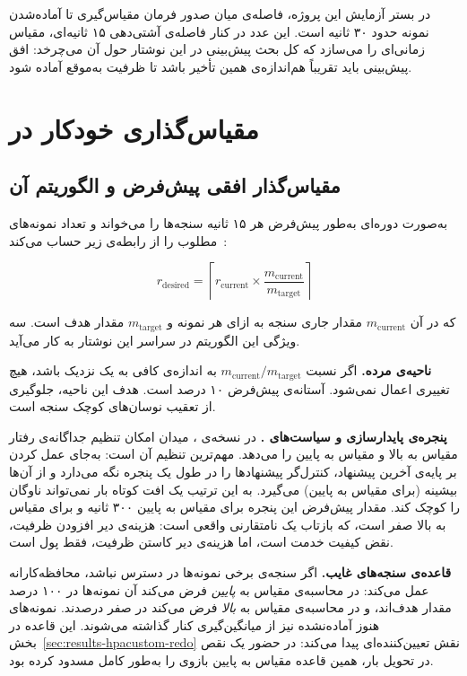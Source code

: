 در بستر آزمایش این پروژه، فاصله‌ی میان صدور فرمان مقیاس‌گیری تا آماده‌شدن نمونه حدود ۳۰ ثانیه
است. این عدد در کنار فاصله‌ی آشتی‌دهی ۱۵ ثانیه‌ای، مقیاس زمانی‌ای را می‌سازد که کل بحث
پیش‌بینی در این نوشتار حول آن می‌چرخد: افق پیش‌بینی باید تقریباً هم‌اندازه‌ی همین تأخیر باشد
تا ظرفیت به‌موقع آماده شود.

\section{مقیاس‌گذاری خودکار در }
\label{sec:bg-autoscaling-k8s}

\subsection{مقیاس‌گذار افقی پیش‌فرض و الگوریتم آن}
\label{sec:bg-hpa}

 به‌صورت دوره‌ای \mdash{} به‌طور پیش‌فرض هر ۱۵ ثانیه \mdash{} سنجه‌ها را
می‌خواند و تعداد نمونه‌های مطلوب را از رابطه‌ی زیر حساب می‌کند~\cite{k8sdocs-hpa}:

\begin{equation}
\label{eq:hpa}
r_{\mathrm{desired}} = \left\lceil r_{\mathrm{current}} \times
\frac{m_{\mathrm{current}}}{m_{\mathrm{target}}} \right\rceil
\end{equation}

که در آن $m_{\mathrm{current}}$ مقدار جاری سنجه به ازای هر نمونه و $m_{\mathrm{target}}$ مقدار
هدف است. سه ویژگی این الگوریتم در سراسر این نوشتار به کار می‌آید.

\textbf{ناحیه‌ی مرده.} اگر نسبت $m_{\mathrm{current}}/m_{\mathrm{target}}$ به اندازه‌ی کافی به یک
نزدیک باشد، هیچ تغییری اعمال نمی‌شود. آستانه‌ی پیش‌فرض ۱۰ درصد است. هدف این ناحیه، جلوگیری از
تعقیب نوسان‌های کوچک سنجه است.

\textbf{پنجره‌ی پایدارسازی و سیاست‌های .} در نسخه‌ی ،
میدان  امکان تنظیم جداگانه‌ی رفتار مقیاس به بالا و مقیاس به پایین را می‌دهد.
مهم‌ترین تنظیم آن  است: به‌جای عمل کردن بر پایه‌ی آخرین
پیشنهاد، کنترل‌گر پیشنهادها را در طول یک پنجره نگه می‌دارد و از آن‌ها بیشینه (برای مقیاس به
پایین) می‌گیرد. به این ترتیب یک افت کوتاه بار نمی‌تواند ناوگان را کوچک کند. مقدار پیش‌فرض این
پنجره برای مقیاس به پایین ۳۰۰ ثانیه و برای مقیاس به بالا صفر است، که بازتاب یک نامتقارنی
واقعی است: هزینه‌ی دیر افزودن ظرفیت، نقض کیفیت خدمت است، اما هزینه‌ی دیر کاستن ظرفیت، فقط
پول است.

\textbf{قاعده‌ی سنجه‌های غایب.} اگر سنجه‌ی برخی نمونه‌ها در
دسترس نباشد،  محافظه‌کارانه عمل می‌کند: در محاسبه‌ی مقیاس به \emph{پایین} فرض می‌کند
آن نمونه‌ها در ۱۰۰ درصد مقدار هدف‌اند، و در محاسبه‌ی مقیاس به \emph{بالا} فرض می‌کند در صفر
درصدند. نمونه‌های هنوز آماده‌نشده نیز از میانگین‌گیری کنار گذاشته می‌شوند. این قاعده در
بخش~\ref{sec:results-hpacustom-redo} نقش تعیین‌کننده‌ای پیدا می‌کند: در حضور یک نقص در تحویل
بار، همین قاعده مقیاس به پایین بازوی  را به‌طور کامل مسدود کرده بود.

